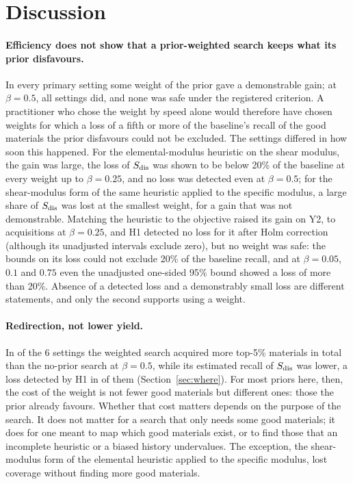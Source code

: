 \section{Discussion}\label{sec:discussion}

\paragraph{Efficiency does not show that a prior-weighted search keeps what its prior disfavours.} In every primary setting
some weight of the prior gave a demonstrable gain; at $\beta=0.5$, all  settings did, and none was
safe under the registered criterion. A practitioner who chose the weight by speed alone would therefore have chosen weights
for which a loss of a fifth or more of the baseline's recall of the good materials the prior disfavours could not be
excluded. The settings differed in how soon this happened. For the elemental-modulus heuristic on the shear modulus, the gain
was large, the loss of $S_{\mathrm{dis}}$ was shown to be below 20\% of the baseline at every weight up to $\beta=0.25$, and no loss was
detected even at $\beta=0.5$; for the shear-modulus form of the same heuristic applied to the
specific modulus, a large share of $S_{\mathrm{dis}}$ was lost at the smallest weight, for a gain that was not demonstrable. Matching the
heuristic to the objective raised its gain on Y2, to 
 acquisitions at $\beta=0.25$, and H1 detected no loss for it after Holm
correction (although its unadjusted intervals exclude zero), but no weight was safe: the bounds on its loss could not exclude 20\% of the baseline recall, and at $\beta=0.05$, $0.1$ and $0.75$ even the
unadjusted one-sided 95\% bound showed a loss of more than 20\%. Absence of a detected loss and a demonstrably small loss are different
statements, and only the second supports using a weight.

\paragraph{Redirection, not lower yield.} In  of the 6 settings the weighted search acquired more top-5\%
materials in total than the no-prior search at $\beta=0.5$, while its estimated recall of $S_{\mathrm{dis}}$ was lower, a loss detected by H1 in
 of them (Section~\ref{sec:where}). For most priors here,
then, the cost of the weight is not fewer good materials but different ones: those the prior already favours. Whether that cost
matters depends on the purpose of the search. It does not matter for a search that only needs some good materials; it does for one
meant to map which good materials exist, or to find those that an incomplete heuristic or a biased history undervalues. The
exception, the shear-modulus form of the elemental heuristic applied to the specific modulus, lost coverage without finding more
good materials.

